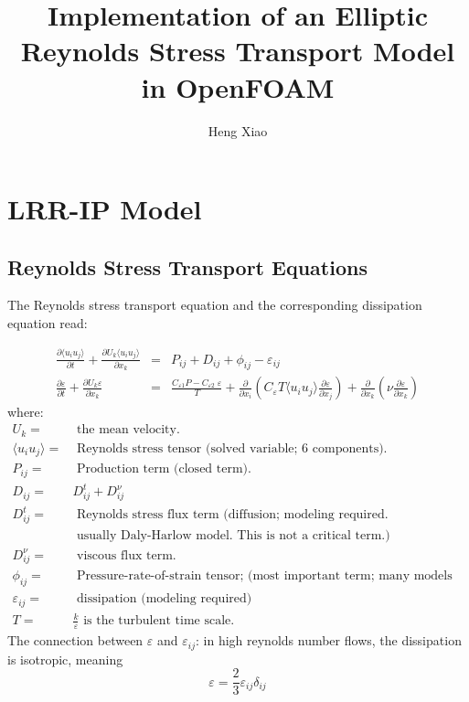 \documentclass[11pt]{article}
\title{Implementation of an Elliptic Reynolds Stress Transport Model in OpenFOAM}
\author{Heng Xiao}
\begin{document}
\maketitle
\section{LRR-IP Model}
\subsection{Reynolds Stress Transport Equations}
The Reynolds stress transport equation and the corresponding dissipation equation read:

\begin{eqnarray}
\frac{\partial \langle u_{i} u_{j} \rangle}{\partial t} + \frac{\partial U_{k} \langle u_{i} u_{j} \rangle}{\partial x_{k}} &=& P_{ij} + D_{ij} + \phi_{ij} - \varepsilon_{ij} \\
\frac{\partial \varepsilon}{\partial t} + \frac{\partial U_{k} \varepsilon }{\partial x_{k}} &=& \frac{C_{\varepsilon 1}P - C_{\varepsilon 2} \;\varepsilon }{T} + \frac{\partial}{\partial x_{i}}{ \left( C_{\varepsilon} T \langle u_{i} u_{j} \rangle \frac{\partial \varepsilon} {\partial x_{j}} \right)  + \frac{\partial}{\partial x_{k}}} \left( \nu \frac{\partial \varepsilon}{\partial{x_{k}}} \right)
\end{eqnarray}
where:
\begin{align*}
U_{k} =&  \textrm{ the mean velocity.} \\
\langle u_{i} u_{j} \rangle =&
\textrm{ Reynolds stress tensor (solved variable; 6 components).} \\
P_{ij} =& \textrm{ Production term (closed term).} \\
D_{ij} =& D_{ij}^{t} + D_{ij}^{\nu} \\
D_{ij}^{t} =& \textrm{ Reynolds stress flux term (diffusion; modeling required.} \\
	&  \textrm{ usually Daly-Harlow model.  This is not a critical term.)} \\
D_{ij}^{\nu} = & \textrm{ viscous flux term.} \\
\phi_{ij}  =& \textrm{ Pressure-rate-of-strain tensor; (most important term; many models exist!) }\\
\varepsilon_{ij} =& \textrm{ dissipation (modeling required)} \\
T =& \frac{k}{\varepsilon} \textrm{ is the turbulent time scale.}
\end{align*}
The connection between $\varepsilon$ and $\varepsilon_{ij}$: in high reynolds number flows, the dissipation is isotropic, meaning
\begin{equation}
\varepsilon = \frac{2}{3}\varepsilon_{ij} \delta_{ij}
\end{equation}
\end{document}
